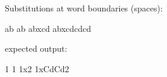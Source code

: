 \documentclass{article}
\begin{document}
Substitutions at word boundaries (spaces):

ab ab abxcd abxcdcdcd

expected output:

1 1 1x2 1xCdCd2
\end{document}
